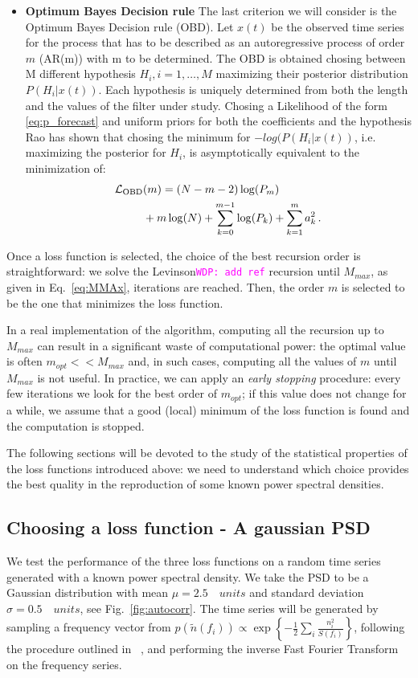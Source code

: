\documentclass[twocolumn,showpacs,preprintnumbers,nofootinbib,prd,
superscriptaddress,10pt]{revtex4-1}
\newcommand{\wdp}[1]{{\textcolor{magenta}{\texttt{WDP: #1}} }}
\begin{document}
\begin{itemize}
\item \textbf{Optimum Bayes Decision rule} 
The last criterion we will consider is the Optimum Bayes Decision rule (OBD)\cite{doi:10.1029/WR018i004p01097}. Let $x(t)$ be the observed 
time series for the process that has to be described as an autoregressive process of order $m$ (AR(m)) with m to be determined. The OBD is obtained chosing between M different hypothesis $H_i, i = 1, \dots, M$ maximizing their posterior distribution $P(H_i\vert x(t))$. Each
hypothesis is uniquely determined from both the length and the values of the filter under study. Chosing a Likelihood of the form \ref{eq:p_forecast} and uniform priors for both the coefficients and the hypothesis Rao has shown that chosing the minimum for $-log(P(H_i \vert x(t))$, i.e. maximizing the posterior for $H_i$, is asymptotically equivalent to the minimization of: 
   \begin{align}
        \mathcal{L}_{\rm OBD}&(m) = (N - m - 2) \log(P_m) \nonumber\\
        &+ m \log(N) + \sum_{k = 0}^{m-1} \log(P_k) + \sum_{k = 1}^{m} a_k^2\,.
    \end{align}
\end{itemize}

Once a loss function is selected, the choice of the best recursion order is straightforward: we solve the Levinson\wdp{add ref} recursion until $M_{max}$, as given in Eq.~\ref{eq:MMAx}, iterations are reached. Then, the order $m$ is selected to be the one that minimizes the loss function.

In a real implementation of the algorithm, computing all the recursion up to $M_{max}$ can result in a significant waste of computational power: the optimal value is often $m_{opt} << M_{max}$ and, in such cases, computing all the values of $m$ until $M_{max}$ is not useful.
In practice, we can apply an \textit{early stopping} procedure: every few iterations we look for the best order of $m_{opt}$; if this value does not change for a while, we assume that a good (local) minimum of the loss function is found and the computation is stopped.

The following sections will be devoted to the study of the statistical properties of the loss functions introduced above: we need to understand which choice provides the best quality in the reproduction of some known power spectral densities. 

\subsection{Choosing a loss function - A gaussian PSD} \label{sec:arp_validation}
We test the performance of the three loss functions on a random time series generated with a known power spectral density.
We take the PSD to be a Gaussian distribution with mean $\mu = 2.5 \quad units$ and standard deviation $\sigma = 0.5 \quad units$, see Fig.~\ref{fig:autocorr}.
The time series will be generated by sampling a frequency vector from ${p(\tilde{n}(f_i)) \propto \exp{\left\{-\frac{1}{2}\sum_i\frac{n_i ^2}{S(f_i)}\right\}}}$, following the procedure outlined in ~\cite{}, and performing the inverse Fast Fourier Transform on the frequency series.
\end{document}
